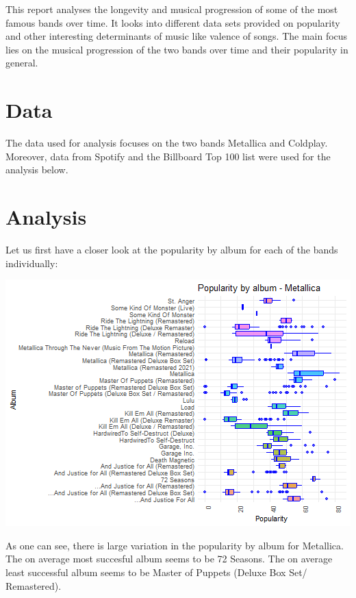 \documentclass[11pt,preprint, authoryear]{elsarticle}
\let\origfigure\figure
\let\endorigfigure\endfigure
\renewenvironment{figure}[1][2] {
    \expandafter\origfigure\expandafter[H]
} {
    \endorigfigure
}
\numberwithin{equation}{section}
\numberwithin{figure}{section}
\numberwithin{table}{section}
\begin{document}
This report analyses the longevity and musical progression of some of
the most famous bands over time. It looks into different data sets
provided on popularity and other interesting determinants of music like
valence of songs. The main focus lies on the musical progression of the
two bands over time and their popularity in general.

\hypertarget{data}{%
\section{Data}\label{data}}

The data used for analysis focuses on the two bands Metallica and
Coldplay. Moreover, data from Spotify and the Billboard Top 100 list
were used for the analysis below.

\hypertarget{analysis}{%
\section{Analysis}\label{analysis}}

Let us first have a closer look at the popularity by album for each of
the bands individually:

\begin{figure}[H]

{\centering \includegraphics{Question2_files/figure-latex/Figure1-1} 

}

\caption{Popularity by album of Metallica \label{Figure1}}\label{fig:Figure1}
\end{figure}

As one can see, there is large variation in the popularity by album for
Metallica. The on average most succesful album seems to be 72 Seasons.
The on average least successful album seems to be Master of Puppets
(Deluxe Box Set/ Remastered).
\end{document}
